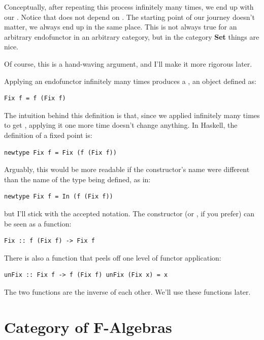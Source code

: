 Conceptually, after repeating this process infinitely many times, we end
up with our . Notice that  does not depend on
. The starting point of our journey doesn't matter, we always
end up in the same place. This is not always true for an arbitrary
endofunctor in an arbitrary category, but in the category \textbf{Set}
things are nice.

Of course, this is a hand-waving argument, and I'll make it more
rigorous later.

Applying an endofunctor infinitely many times produces a , an object defined as:

\begin{verbatim}
Fix f = f (Fix f)
\end{verbatim}

The intuition behind this definition is that, since we applied
 infinitely many times to get , applying it one
more time doesn't change anything. In Haskell, the definition of a fixed
point is:

\begin{verbatim}
newtype Fix f = Fix (f (Fix f))
\end{verbatim}

Arguably, this would be more readable if the constructor's name were
different than the name of the type being defined, as in:

\begin{verbatim}
newtype Fix f = In (f (Fix f))
\end{verbatim}

but I'll stick with the accepted notation. The constructor 
(or , if you prefer) can be seen as a function:

\begin{verbatim}
Fix :: f (Fix f) -> Fix f
\end{verbatim}

There is also a function that peels off one level of functor
application:

\begin{verbatim}
unFix :: Fix f -> f (Fix f) unFix (Fix x) = x
\end{verbatim}

The two functions are the inverse of each other. We'll use these
functions later.

\section{Category of F-Algebras}\label{category-of-f-algebras}

